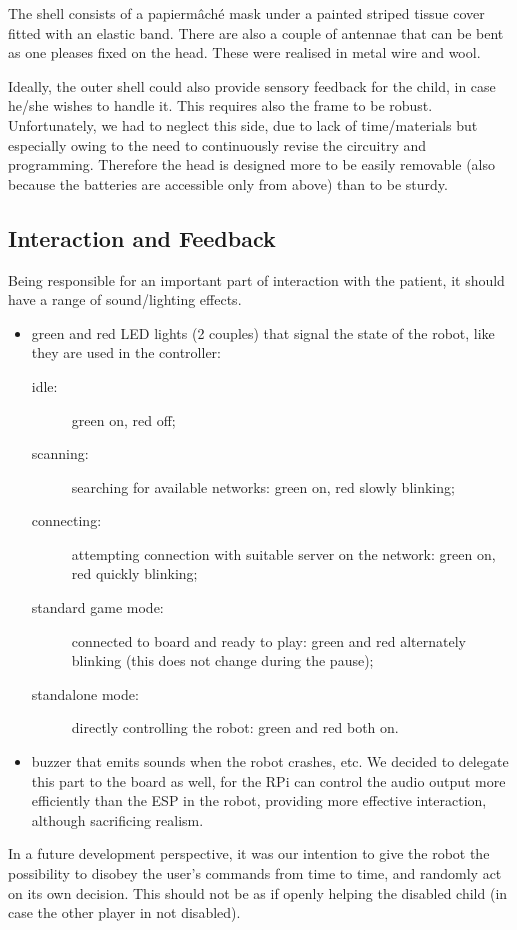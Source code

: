 \documentclass[a4paper,twoside]{book}
\begin{document}
The shell consists of a papier\textendash m\^{a}ch\'{e} mask under a painted striped tissue cover fitted with an elastic band. There are also a couple of antennae that can be bent as one pleases fixed on the head. These were realised in metal wire and wool.

Ideally, the outer shell could also provide sensory feedback for the child, in case he/she wishes to handle it.
This requires also the frame to be robust. Unfortunately, we had to neglect this side, due to lack of time/materials but especially owing to the need to continuously revise the circuitry and programming. Therefore the head is designed more to be easily removable (also because the batteries are accessible only from above) than to be sturdy.

\subsection{Interaction and Feedback}

\beforelist* Being responsible for an important part of interaction with the patient, it should have a range of sound/lighting effects.
\begin{itemize}
\item green and red LED lights (2 couples) that signal the state of the robot, like they are used in the controller:
  \begin{description}
  \item[idle:] green on, red off;
  \item[scanning:] searching for available networks: green on, red slowly blinking;
  \item[connecting:] attempting connection with suitable server on the network: green on, red quickly blinking;
  \item[standard game mode:] connected to board and ready to play: green and red alternately blinking (this does not change during the pause);
  \item[standalone mode:] directly controlling the robot: green and red both on.
  \end{description}
\item buzzer that emits sounds when the robot crashes, etc. We decided to delegate this part to the board as well, for the RPi can control the audio output more efficiently than the ESP in the robot, providing more effective interaction, although sacrificing realism.
\end{itemize}
\afterlist*
In a future development perspective, it was our intention to give the robot the possibility to disobey the user's commands from time to time, and randomly act on its own decision. This should not be as if openly helping the disabled child (in case the other player in not disabled).
\end{document}
